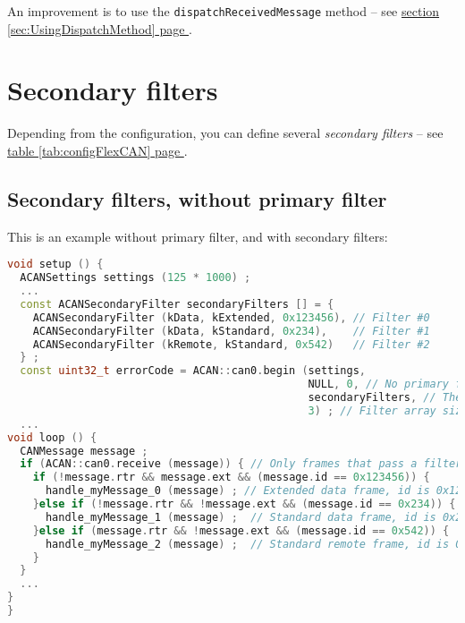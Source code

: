 \documentclass[10pt, a4paper, obeyspaces, openany]{extarticle}
\newcommand \sectionLabel[2]{\section{#1}\label{sec:#2}}
\newcommand\refSectionPage[1]{\hyperref[sec:#1]{section \ref*{sec:#1} page \pageref{sec:#1}}}
\newcommand\refTableauPage[1]{\hyperref[tab:#1]{table \ref*{tab:#1} page \pageref{tab:#1}}}
\begin{document}
An improvement is to use the \texttt{dispatchReceivedMessage} method -- see \refSectionPage{UsingDispatchMethod}.











\sectionLabel{Secondary filters}{secondaryFilters}

Depending from the configuration, you can define several \emph{secondary filters} -- see \refTableauPage{configFlexCAN}.



\subsection{Secondary filters, without primary filter}

This is an example without primary filter, and with secondary filters:
{ \small\begin{lstlisting}[language=c++]
void setup () {
  ACANSettings settings (125 * 1000) ;
  ...
  const ACANSecondaryFilter secondaryFilters [] = {
    ACANSecondaryFilter (kData, kExtended, 0x123456), // Filter #0
    ACANSecondaryFilter (kData, kStandard, 0x234),    // Filter #1
    ACANSecondaryFilter (kRemote, kStandard, 0x542)   // Filter #2
  } ;
  const uint32_t errorCode = ACAN::can0.begin (settings,
                                               NULL, 0, // No primary filter
                                               secondaryFilters, // The filter array
                                               3) ; // Filter array size
  ...
void loop () {
  CANMessage message ;
  if (ACAN::can0.receive (message)) { // Only frames that pass a filter are retrieved
    if (!message.rtr && message.ext && (message.id == 0x123456)) {
      handle_myMessage_0 (message) ; // Extended data frame, id is 0x123456
    }else if (!message.rtr && !message.ext && (message.id == 0x234)) {
      handle_myMessage_1 (message) ;  // Standard data frame, id is 0x234
    }else if (message.rtr && !message.ext && (message.id == 0x542)) {
      handle_myMessage_2 (message) ;  // Standard remote frame, id is 0x542
    }
  }
  ...
}
}
\end{lstlisting}}
\end{document}
